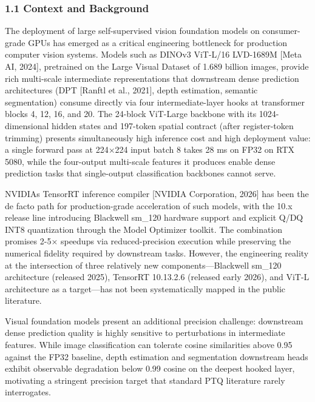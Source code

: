 \documentclass[
]{article}
\begin{document}
\subsubsection{1.1 Context and
Background}\label{11-context-and-background}

The deployment of large self-supervised vision foundation models on
consumer-grade GPUs has emerged as a critical engineering bottleneck for
production computer vision systems. Models such as DINOv3 ViT-L/16
LVD-1689M {[}Meta AI, 2024{]}, pretrained on the Large Visual Dataset of
1.689 billion images, provide rich multi-scale intermediate
representations that downstream dense prediction architectures (DPT
{[}Ranftl et al., 2021{]}, depth estimation, semantic segmentation)
consume directly via four intermediate-layer hooks at transformer blocks
4, 12, 16, and 20. The 24-block ViT-Large backbone with its
1024-dimensional hidden states and 197-token spatial contract (after
register-token trimming) presents simultaneously high inference cost and
high deployment value: a single forward pass at 224×224 input batch 8
takes 28 ms on FP32 on RTX 5080, while the four-output multi-scale
features it produces enable dense prediction tasks that single-output
classification backbones cannot serve.

NVIDIA\textquotesingle s TensorRT inference compiler {[}NVIDIA
Corporation, 2026{]} has been the de facto path for production-grade
acceleration of such models, with the 10.x release line introducing
Blackwell sm\_120 hardware support and explicit Q/DQ INT8 quantization
through the Model Optimizer toolkit. The combination promises 2-5×
speedups via reduced-precision execution while preserving the numerical
fidelity required by downstream tasks. However, the engineering reality
at the intersection of three relatively new components---Blackwell
sm\_120 architecture (released 2025), TensorRT 10.13.2.6 (released early
2026), and ViT-L architecture as a target---has not been systematically
mapped in the public literature.

Visual foundation models present an additional precision challenge:
downstream dense prediction quality is highly sensitive to perturbations
in intermediate features. While image classification can tolerate cosine
similarities above 0.95 against the FP32 baseline, depth estimation and
segmentation downstream heads exhibit observable degradation below 0.99
cosine on the deepest hooked layer, motivating a stringent precision
target that standard PTQ literature rarely interrogates.
\end{document}
